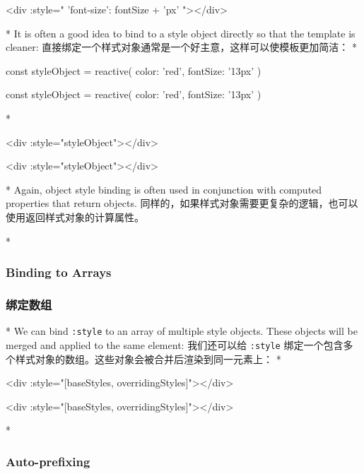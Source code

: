 \begin{paracol}{2}
\switchcolumn
\begin{codeHtml}
<div :style="{ 'font-size': fontSize + 'px' }"></div>
\end{codeHtml}
\switchcolumn[0]*%
It is often a good idea to bind to a style object directly so that the
template is cleaner:
\switchcolumn
直接绑定一个样式对象通常是一个好主意，这样可以使模板更加简洁：
\switchcolumn[0]*%
\begin{codeJs}
const styleObject = reactive({
    color: 'red',
    fontSize: '13px'
})
\end{codeJs}
\switchcolumn
\begin{codeJs}
const styleObject = reactive({
    color: 'red',
    fontSize: '13px'
})
\end{codeJs}
\switchcolumn[0]*%
\begin{codeHtml}
<div :style="styleObject"></div>
\end{codeHtml}
\switchcolumn
\begin{codeHtml}
<div :style="styleObject"></div>
\end{codeHtml}
\switchcolumn[0]*%
Again, object style binding is often used in conjunction with computed
properties that return objects.
\switchcolumn
同样的，如果样式对象需要更复杂的逻辑，也可以使用返回样式对象的计算属性。


\switchcolumn[0]*%
\subsubsection{Binding to Arrays}
\switchcolumn
\subsubsection{绑定数组}
\switchcolumn[0]*%
We can bind \texttt{:style} to an array of multiple style objects. These
objects will be merged and applied to the same element:
\switchcolumn
我们还可以给 \texttt{:style}
绑定一个包含多个样式对象的数组。这些对象会被合并后渲染到同一元素上：
\switchcolumn[0]*%
\begin{codeHtml}
<div :style="[baseStyles, overridingStyles]"></div>
\end{codeHtml}
\switchcolumn
\begin{codeHtml}
<div :style="[baseStyles, overridingStyles]"></div>
\end{codeHtml}
\switchcolumn[0]*%
\subsubsection{Auto-prefixing}
\switchcolumn

\end{paracol}
